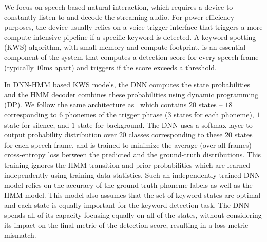 \documentclass{article}
\begin{document}
We focus on speech based natural interaction, which requires a device to constantly listen to and decode the streaming audio.
For power efficiency purposes, the device usually relies on a voice trigger interface that triggers a more compute-intensive pipeline if a specific keyword is detected.
A keyword spotting (KWS) algorithm, with small memory and compute footprint, is an essential component of the system that computes a detection score for every speech frame (typically $10$ms apart) and triggers if the score exceeds a threshold.

In DNN-HMM based KWS models, the DNN computes the state probabilities and the HMM decoder combines these probabilities using dynamic programming (DP).
We follow the same architecture as~\cite{SigtiaHRMB18} which contains $20$ states -- $18$ corresponding to $6$ phonemes of the trigger phrase ($3$ states for each phoneme), $1$ state for silence, and $1$ state for background.
The DNN uses a softmax layer to output probability distribution over $20$ classes corresponding to these $20$ states for each speech frame, and is trained to minimize the average (over all frames) cross-entropy loss between the predicted and the ground-truth distributions.
This training ignores the HMM transition and prior probabilities which are learned independently using training data statistics.
Such an independently trained DNN model relies on the accuracy of the ground-truth phoneme labels as well as the HMM model.
This model also assumes that the set of keyword states are optimal and each state is equally important for the keyword detection task.
The DNN spends all of its capacity focusing equally on all of the states, without considering its impact on the final metric of the detection score, resulting in a loss-metric mismatch.
\end{document}
